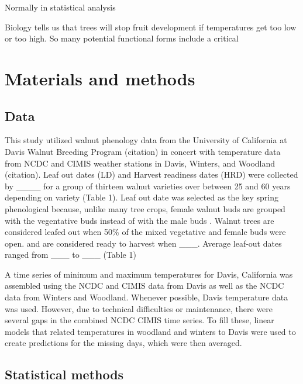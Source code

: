 \documentclass{amsart}
\begin{document}
Normally in statistical analysis 




Biology tells us that trees will stop fruit development if temperatures get too low or too high. So many potential functional forms include a critical 


\section*{Materials and methods}


\subsection*{Data}


This study utilized walnut phenology data from the University of California at Davis Walnut Breeding Program (citation) in concert with temperature data from NCDC and CIMIS weather stations in Davis, Winters, and Woodland (citation). Leaf out dates (LD) and Harvest readiness dates (HRD) were collected by ____ for a group of thirteen walnut varieties over between 25 and 60 years depending on variety (Table 1). Leaf out date was selected as the key spring phenological because, unlike many tree crops, female walnut buds are grouped with the vegentative buds instead of with the male buds \citep{ramos1997}. Walnut trees are considered leafed out when 50\% of the mixed vegetative and female buds were open. and are considered ready to harvest when ___. Average leaf-out dates ranged from ___ to ___ (Table 1)


A time series of minimum and maximum temperatures for Davis, California was assembled using the NCDC and CIMIS data from Davis as well as the NCDC data from Winters and Woodland. Whenever possible, Davis temperature data was used. However, due to technical difficulties or maintenance, there were several gaps in the combined NCDC CIMIS time series. To fill these, linear models that related temperatures in woodland and winters to Davis were used to create predictions for the missing days, which were then averaged.





\subsection*{Statistical methods}


  

\end{document}
